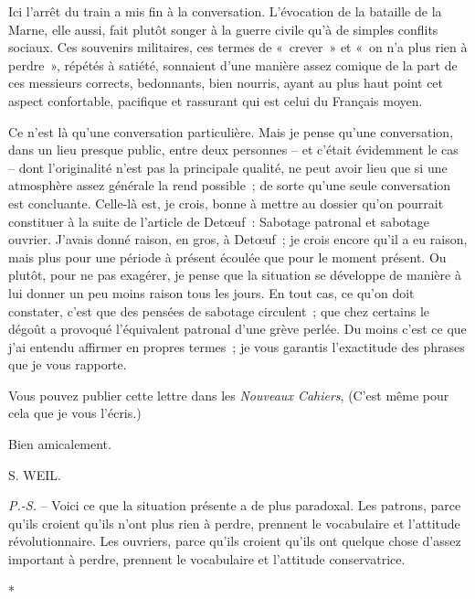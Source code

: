 \documentclass[french,twoside]{book} %
\begin{document}
Ici l'arrêt du train a mis fin à la conversation. L'évocation de la bataille de la Marne, elle aussi, fait plutôt songer à la guerre civile qu'à de simples conflits sociaux. Ces souvenirs militaires, ces termes de « crever » et « on n'a plus rien à perdre », répétés à satiété, sonnaient d'une manière assez comique de la part de ces messieurs corrects, bedonnants, bien nourris, ayant au plus haut point cet aspect confortable, pacifique et rassurant qui est celui du Français moyen.\par
Ce n'est là qu'une conversation particulière. Mais je pense qu'une conversation, dans un lieu presque public, entre deux personnes – et c'était évidemment le cas – dont l'originalité n'est pas la principale qualité, ne peut avoir lieu que si une atmosphère assez générale la rend possible ; de sorte qu'une seule conversation est concluante. Celle-là est, je crois, bonne à mettre au dossier qu'on pourrait constituer à la suite de l'article de Detœuf : Sabotage patronal et sabotage ouvrier. J'avais donné raison, en gros, à Detœuf ; je crois encore qu'il a eu raison, mais plus pour une période à présent écoulée que pour le moment présent. Ou plutôt, pour ne pas exagérer, je pense que la situation se développe de manière à lui donner un peu moins raison tous les jours. En tout cas, ce qu'on doit constater, c'est que des pensées de sabotage circulent ; que chez certains le dégoût a provoqué l'équivalent patronal d'une grève perlée. Du moins c'est ce que j'ai entendu affirmer en propres termes ; je vous garantis l'exactitude des phrases que je vous rapporte.\par
Vous pouvez publier cette lettre dans les {\itshape Nouveaux Cahiers}, (C'est même pour cela que je vous l'écris.)\par
Bien amicalement.\par
S. WEIL.\par
{\itshape P.-S.} – Voici ce que la situation présente a de plus paradoxal. Les patrons, parce qu'ils croient qu'ils n'ont plus rien à perdre, prennent le vocabulaire et l'attitude révolutionnaire. Les ouvriers, parce qu'ils croient qu'ils ont quelque chose d'assez important à perdre, prennent le vocabulaire et l'attitude conservatrice.\par
\par
*
\end{document}
